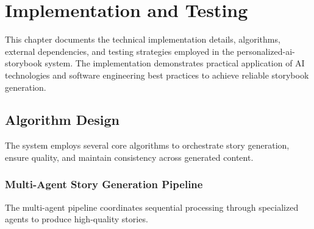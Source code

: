 \chapter{Implementation and Testing}

This chapter documents the technical implementation details, algorithms, external dependencies, and testing strategies employed in the personalized-ai-storybook system. The implementation demonstrates practical application of AI technologies and software engineering best practices to achieve reliable storybook generation.

\section{Algorithm Design}

The system employs several core algorithms to orchestrate story generation, ensure quality, and maintain consistency across generated content.

\subsection{Multi-Agent Story Generation Pipeline}

The multi-agent pipeline coordinates sequential processing through specialized agents to produce high-quality stories.

